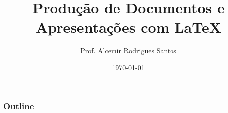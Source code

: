 \documentclass[table,11pt]{beamer}
\title{Produção de Documentos e Apresentações com \LaTeX}
\author{Prof. Alcemir Rodrigues Santos}
\institute{\small Laboratório de Engenharia de Software\\
{\footnotesize Universidade Estadual do Piauí}}
\date{\today}
\begin{document}
 
 
\begin{frame}[plain]    
  \titlepage  
\end{frame}   
    

\begin{frame}  
\frametitle{Outline} 
\tableofcontents
\end{frame} 





\end{document}
